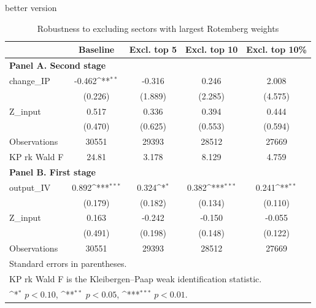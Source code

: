 better version 

\begin{table}[htbp]\centering
\def\sym#1{\ifmmode^{#1}\else\(^{#1}\)\fi}
\caption{Robustness to excluding sectors with largest Rotemberg weights}
\begin{tabular}{l*{4}{c}}
\hline\hline
            & Baseline & Excl. top 5 & Excl. top 10 & Excl. top 10\% \\
\hline
\multicolumn{5}{l}{\textbf{Panel A. Second stage}}\\
change\_IP   & -0.462\sym{**} & -0.316 & 0.246 & 2.008 \\
             & (0.226)        & (1.889) & (2.285) & (4.575) \\
Z\_input     & 0.517          & 0.336   & 0.394   & 0.444 \\
             & (0.470)        & (0.625) & (0.553) & (0.594) \\
\hline
Observations  & 30551 & 29393 & 28512 & 27669 \\
KP rk Wald F & 24.81 & 3.178 & 8.129 & 4.759 \\
\hline
\multicolumn{5}{l}{\textbf{Panel B. First stage}}\\
output\_IV    & 0.892\sym{***} & 0.324\sym{*} & 0.382\sym{***} & 0.241\sym{**} \\
              & (0.179)        & (0.182)      & (0.134)        & (0.110) \\
Z\_input      & 0.163          & -0.242       & -0.150         & -0.055 \\
              & (0.491)        & (0.198)      & (0.148)        & (0.122) \\
\hline
Observations   & 30551 & 29393 & 28512 & 27669 \\
\hline\hline
\multicolumn{5}{l}{\footnotesize Standard errors in parentheses.}\\
\multicolumn{5}{l}{\footnotesize KP rk Wald F is the Kleibergen--Paap weak identification statistic.}\\
\multicolumn{5}{l}{\footnotesize \sym{*} \(p<0.10\), \sym{**} \(p<0.05\), \sym{***} \(p<0.01\).}
\end{tabular}
\end{table}